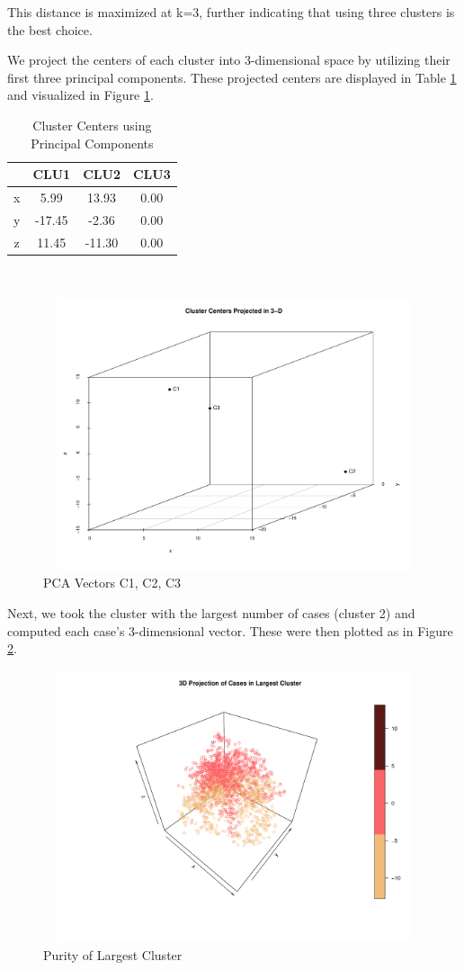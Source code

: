 \documentclass{homework}
\begin{document}
This distance is maximized at k=3, further indicating that using three clusters is the best choice.

\newpage
\question %
We project the centers of each cluster into 3-dimensional space by utilizing their first three principal components. These projected centers are displayed in Table \ref{Proj} and visualized in Figure \ref{Cent}. 

\begin{table}[h]
    \centering
    {\begin{tabular}{c|ccc}
         &CLU1&CLU2&CLU3\\\hline
         x&5.99&13.93&0.00\\
         y&-17.45&-2.36&0.00\\
         z&11.45&-11.30&0.00
    \end{tabular}}\\
    \caption{Cluster Centers using Principal Components}
    \label{Proj}
\end{table}

\begin{figure}[H]
    \centering
    \includegraphics[width=12cm,height=8cm]{graphs/HW4_pcac.pdf}
    \caption{PCA Vectors C1, C2, C3}
    \label{Cent}
\end{figure}

Next, we took the cluster with the largest number of cases (cluster 2) and computed each case's 3-dimensional vector. These were then plotted as in Figure \ref{Pur}. 

\begin{figure}[H]
    \centering
    \includegraphics[width=12cm,height=8cm]{graphs/HW4_bigclu.pdf}
    \caption{Purity of Largest Cluster}
    \label{Pur}
\end{figure}
\end{document}
